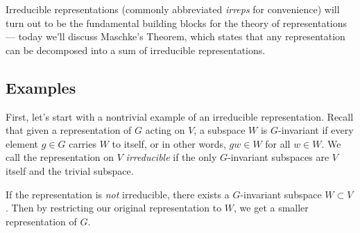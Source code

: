 
Irreducible representations (commonly abbreviated \emph{irreps} for convenience) will turn out to be the fundamental building blocks for the theory of representations --- today we'll discuss Maschke's Theorem, which states that any representation can be decomposed into a sum of irreducible representations. 

\subsection{Examples}



First, let's start with a nontrivial example of an irreducible representation. Recall that given a representation of $G$ acting on $V$, a subspace $W$ is $G$-invariant if every element $g \in G$ carries $W$ to itself, or in other words, $gw \in W$ for all $w \in W$. We call the representation on $V$ \emph{irreducible} if the only $G$-invariant subspaces are $V$ itself and the trivial subspace.

If the representation is \emph{not} irreducible, there exists a $G$-invariant subspace $W \subset V$. Then by restricting our original representation to $W$, we get a smaller representation of $G$. 

